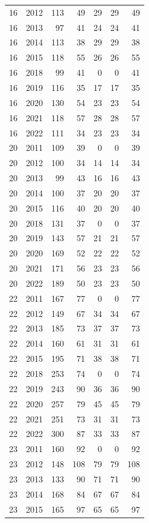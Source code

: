 \begin{longtable}{llrrrrr}
16 & 2012 & 113 & 49 & 29 & 29 & 49 \\
16 & 2013 & 97 & 41 & 24 & 24 & 41 \\
16 & 2014 & 113 & 38 & 29 & 29 & 38 \\
16 & 2015 & 118 & 55 & 26 & 26 & 55 \\
16 & 2018 & 99 & 41 & 0 & 0 & 41 \\
16 & 2019 & 116 & 35 & 17 & 17 & 35 \\
16 & 2020 & 130 & 54 & 23 & 23 & 54 \\
16 & 2021 & 118 & 57 & 28 & 28 & 57 \\
16 & 2022 & 111 & 34 & 23 & 23 & 34 \\
20 & 2011 & 109 & 39 & 0 & 0 & 39 \\
20 & 2012 & 100 & 34 & 14 & 14 & 34 \\
20 & 2013 & 99 & 43 & 16 & 16 & 43 \\
20 & 2014 & 100 & 37 & 20 & 20 & 37 \\
20 & 2015 & 116 & 40 & 20 & 20 & 40 \\
20 & 2018 & 131 & 37 & 0 & 0 & 37 \\
20 & 2019 & 143 & 57 & 21 & 21 & 57 \\
20 & 2020 & 169 & 52 & 22 & 22 & 52 \\
20 & 2021 & 171 & 56 & 23 & 23 & 56 \\
20 & 2022 & 189 & 50 & 23 & 23 & 50 \\
22 & 2011 & 167 & 77 & 0 & 0 & 77 \\
22 & 2012 & 149 & 67 & 34 & 34 & 67 \\
22 & 2013 & 185 & 73 & 37 & 37 & 73 \\
22 & 2014 & 160 & 61 & 31 & 31 & 61 \\
22 & 2015 & 195 & 71 & 38 & 38 & 71 \\
22 & 2018 & 253 & 74 & 0 & 0 & 74 \\
22 & 2019 & 243 & 90 & 36 & 36 & 90 \\
22 & 2020 & 257 & 79 & 45 & 45 & 79 \\
22 & 2021 & 251 & 73 & 31 & 31 & 73 \\
22 & 2022 & 300 & 87 & 33 & 33 & 87 \\
23 & 2011 & 160 & 92 & 0 & 0 & 92 \\
23 & 2012 & 148 & 108 & 79 & 79 & 108 \\
23 & 2013 & 133 & 90 & 71 & 71 & 90 \\
23 & 2014 & 168 & 84 & 67 & 67 & 84 \\
23 & 2015 & 165 & 97 & 65 & 65 & 97 \\

\end{longtable}
